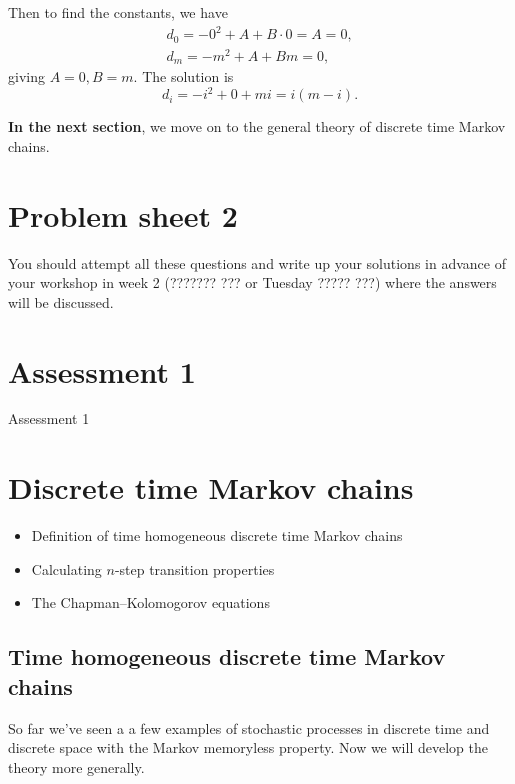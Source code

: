 \documentclass[
  a4paper,
]{article}
\providecommand{\tightlist}{%
  \setlength{\itemsep}{0pt}\setlength{\parskip}{0pt}}
\theoremstyle{definition}
\theoremstyle{definition}
\theoremstyle{definition}
\theoremstyle{remark}
\begin{document}
Then to find the constants, we have
\begin{gather*} d_0 = -0^2 + A + B\cdot0 = A = 0, \\
                  d_m = -m^2 + A + Bm = 0 , \end{gather*}
giving \(A = 0, B = m\). The solution is
\[ d_i = -i^2 + 0 + mi = i(m-i) .\]

\textbf{In the next section}, we move on to the general theory of discrete time Markov chains.

\hypertarget{P02}{%
\section*{Problem sheet 2}\label{P02}}

You should attempt all these questions and write up your solutions in advance of your workshop in week 2 (??????? ??? or Tuesday ????? ???) where the answers will be discussed.

\hypertarget{A1}{%
\section*{Assessment 1}\label{A1}}

Assessment 1

\hypertarget{S05-markov-chains}{%
\section{Discrete time Markov chains}\label{S05-markov-chains}}

\begin{itemize}
\tightlist
\item
  Definition of time homogeneous discrete time Markov chains
\item
  Calculating \(n\)-step transition properties
\item
  The Chapman--Kolomogorov equations
\end{itemize}

\hypertarget{thmc}{%
\subsection{Time homogeneous discrete time Markov chains}\label{thmc}}

So far we've seen a a few examples of stochastic processes in discrete time and discrete space with the Markov memoryless property. Now we will develop the theory more generally.
\end{document}
